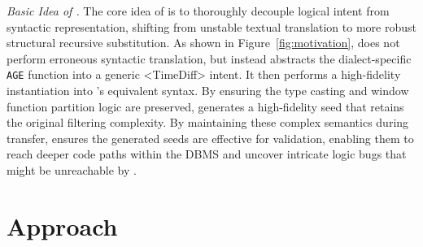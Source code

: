 \documentclass[sigconf,review,anonymous]{acmart}
\begin{document}
\textit{Basic Idea of \tool{}.}
The core idea of \tool{} is to thoroughly decouple logical intent from syntactic representation, shifting from unstable textual translation to more robust structural recursive substitution. 
As shown in Figure~\ref{fig:motivation}, \tool{} does not perform erroneous syntactic translation,
but instead abstracts the dialect-specific \texttt{AGE} function into a generic <TimeDiff> intent. 
It then performs a high-fidelity instantiation into \duckdb{}’s equivalent syntax. By ensuring the type casting and window function partition logic are preserved, \tool{} generates a high-fidelity seed that retains the original filtering complexity. 
By maintaining these complex semantics during transfer, \tool{} ensures the generated seeds are effective for validation, enabling them to reach deeper code paths within the DBMS and uncover intricate logic bugs that might be unreachable by \sedar{}.

\section{Approach}
\label{sec:approach}
\end{document}
